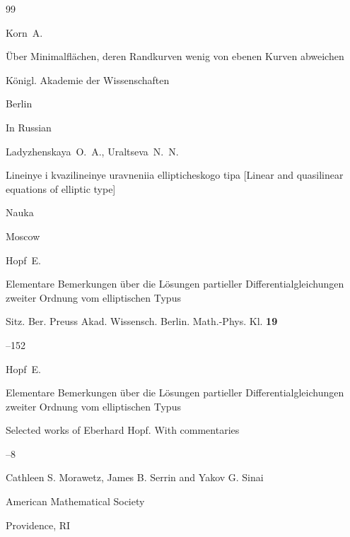 \begin{thebibliography}{99}

\by Korn~A.

\book \"Uber Minimalfl\"achen, deren Randkurven wenig von ebenen Kurven abweichen


\publ K\"onigl. Akademie der Wissenschaften

\publaddr Berlin






\lang In Russian

\by Ladyzhenskaya~O.~A., Uraltseva~N.~N.

\book Lineinye i kvazilineinye uravneniia ellipticheskogo tipa \rm [Linear and quasilinear equations of elliptic type]


\publ Nauka

\publaddr Moscow




\by Hopf~E.

\paper Elementare Bemerkungen \"uber die L\"osungen partieller Differentialgleichungen zweiter Ordnung vom elliptischen Typus

\jour Sitz. Ber. Preuss Akad. Wissensch. Berlin. Math.-Phys. Kl. {\bf 19}


--152


\moreref

\by Hopf~E.

\paper Elementare Bemerkungen \"uber die L\"osungen partieller Differentialgleichungen zweiter Ordnung vom elliptischen Typus

\inbook Selected works of Eberhard Hopf. With commentaries


--8

\eds Cathleen S. Morawetz, James B. Serrin and Yakov G. Sinai

\publ American Mathematical Society

\publaddr Providence, RI





\end{thebibliography}
